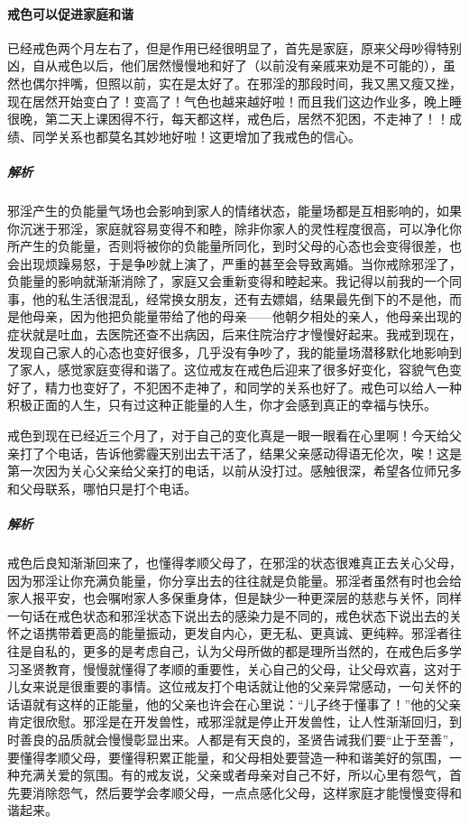\paragraph{戒色可以促进家庭和谐}

\begin{case}
    已经戒色两个月左右了，但是作用已经很明显了，首先是家庭，原来父母吵得特别凶，自从戒色以后，他们居然慢慢地和好了（以前没有亲戚来劝是不可能的），虽然也偶尔拌嘴，但照以前，实在是太好了。在邪淫的那段时间，我又黑又瘦又挫，现在居然开始变白了！变高了！气色也越来越好啦！而且我们这边作业多，晚上睡很晚，第二天上课困得不行，每天都这样，戒色后，居然不犯困，不走神了！！成绩、同学关系也都莫名其妙地好啦！这更增加了我戒色的信心。
    \subparagraph{解析} 邪淫产生的负能量气场也会影响到家人的情绪状态，能量场都是互相影响的，如果你沉迷于邪淫，家庭就容易变得不和睦，除非你家人的灵性程度很高，可以净化你所产生的负能量，否则将被你的负能量所同化，到时父母的心态也会变得很差，也会出现烦躁易怒，于是争吵就上演了，严重的甚至会导致离婚。当你戒除邪淫了，负能量的影响就渐渐消除了，家庭又会重新变得和睦起来。我记得以前我的一个同事，他的私生活很混乱，经常换女朋友，还有去嫖娼，结果最先倒下的不是他，而是他母亲，因为他把负能量带给了他的母亲——他朝夕相处的亲人，他母亲出现的症状就是吐血，去医院还查不出病因，后来住院治疗才慢慢好起来。我戒到现在，发现自己家人的心态也变好很多，几乎没有争吵了，我的能量场潜移默化地影响到了家人，感觉家庭变得和谐了。这位戒友在戒色后迎来了很多好变化，容貌气色变好了，精力也变好了，不犯困不走神了，和同学的关系也好了。戒色可以给人一种积极正面的人生，只有过这种正能量的人生，你才会感到真正的幸福与快乐。
\end{case}

\begin{case}
    戒色到现在已经近三个月了，对于自己的变化真是一眼一眼看在心里啊！今天给父亲打了个电话，告诉他雾霾天别出去干活了，结果父亲感动得语无伦次，唉！这是第一次因为关心父亲给父亲打的电话，以前从没打过。感触很深，希望各位师兄多和父母联系，哪怕只是打个电话。
    \subparagraph{解析} 戒色后良知渐渐回来了，也懂得孝顺父母了，在邪淫的状态很难真正去关心父母，因为邪淫让你充满负能量，你分享出去的往往就是负能量。邪淫者虽然有时也会给家人报平安，也会嘱咐家人多保重身体，但是缺少一种更深层的慈悲与关怀，同样一句话在戒色状态和邪淫状态下说出去的感染力是不同的，戒色状态下说出去的关怀之语携带着更高的能量振动，更发自内心，更无私、更真诚、更纯粹。邪淫者往往是自私的，更多的是考虑自己，认为父母所做的都是理所当然的，在戒色后多学习圣贤教育，慢慢就懂得了孝顺的重要性，关心自己的父母，让父母欢喜，这对于儿女来说是很重要的事情。这位戒友打个电话就让他的父亲异常感动，一句关怀的话语就有这样的正能量，他的父亲也许会在心里说：“儿子终于懂事了！”他的父亲肯定很欣慰。邪淫是在开发兽性，戒邪淫就是停止开发兽性，让人性渐渐回归，到时善良的品质就会慢慢彰显出来。人都是有天良的，圣贤告诫我们要“止于至善”，要懂得孝顺父母，要懂得积累正能量，和父母相处要营造一种和谐美好的氛围，一种充满关爱的氛围。有的戒友说，父亲或者母亲对自己不好，所以心里有怨气，首先要消除怨气，然后要学会孝顺父母，一点点感化父母，这样家庭才能慢慢变得和谐起来。
\end{case}

